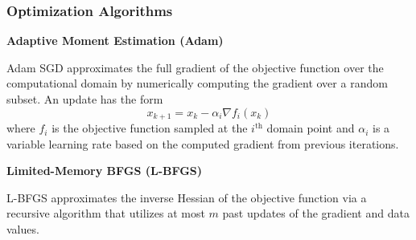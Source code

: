 \begin{frame}
    \frametitle{Optimization Algorithms}
    \textbf{Adaptive Moment Estimation (Adam)}
    
    \bigskip
    Adam SGD approximates the full gradient of the objective function over the computational domain by numerically computing the gradient over a random subset. An update has the form
    \[x_{k+1} = x_k - \alpha_i \nabla f_i(x_k)\]
    where $f_i$ is the objective function sampled at the $i^{\text{th}}$ domain point and $\alpha_i$ is a variable learning rate based on the computed gradient
    from previous iterations.

    \pause
    \bigskip

    \textbf{Limited-Memory BFGS (L-BFGS)}
    
    \bigskip
    L-BFGS approximates the inverse Hessian of the objective function via a recursive algorithm that utilizes at most $m$ past updates of the gradient and data values.
\end{frame}